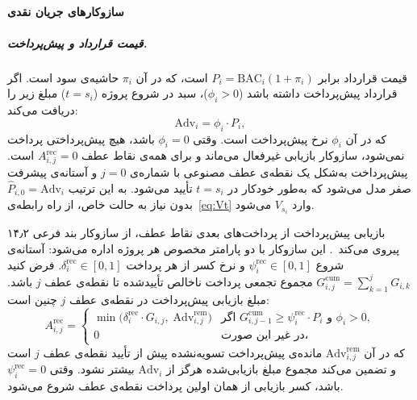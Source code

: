 \paragraph{سازوکارهای جریان نقدی }
\label{subsubsec:cashflow}

\subparagraph{قیمت قرارداد و پیش‌پرداخت.}
قیمت قرارداد برابر $P_i = \mathrm{BAC}_i (1 + \pi_i)$ است، که در آن
$\pi_i$ حاشیه‌ی سود است. اگر قرارداد پیش‌پرداخت داشته باشد
($\phi_i > 0$)، سبد در شروع پروژه ($t = s_i$) مبلغ زیر را دریافت
می‌کند:
\begin{equation}
  \mathrm{Adv}_i = \phi_i \cdot P_i,
  \label{eq:advance}
\end{equation}
که در آن $\phi_i$ نرخ پیش‌پرداخت است. وقتی $\phi_i = 0$ باشد، هیچ
پیش‌پرداختی پرداخت نمی‌شود، سازوکار بازیابی غیرفعال می‌ماند و برای همه‌ی
نقاط عطف $A^{\mathrm{rec}}_{i,j} = 0$ است. پیش‌پرداخت به‌شکل یک نقطه‌ی
عطف مصنوعی با شماره‌ی $j = 0$ و آستانه‌ی پیشرفت صفر مدل می‌شود که
به‌طور خودکار در $t = s_i$ تأیید می‌شود. به این ترتیب
$\hat{P}_{i,0} = \mathrm{Adv}_i$ بدون نیاز به حالت خاص، از راه
رابطه‌ی~\eqref{eq:Vt} وارد $V_{s_i}$ می‌شود.

بازیابی پیش‌پرداخت از پرداخت‌های بعدی نقاط عطف، از سازوکار بند فرعی
۱۴٫۲  پیروی می‌کند~\citep{FIDIC2017}. این سازوکار با دو
پارامتر مخصوص هر پروژه اداره می‌شود: آستانه‌ی شروع
$\psi^{\mathrm{rec}}_i \in [0,1]$ و نرخ کسر از هر پرداخت
$\delta^{\mathrm{rec}}_i \in [0,1]$. فرض کنید
$G^{\mathrm{cum}}_{i,j} = \sum_{k=1}^{j} G_{i,k}$ مجموع تجمعی پرداخت
ناخالص تأییدشده تا نقطه‌ی عطف $j$ باشد. مبلغ بازیابی پیش‌پرداخت در
نقطه‌ی عطف $j$ چنین است:
\begin{equation}
  A^{\mathrm{rec}}_{i,j}
    = \begin{cases}
        \min\!\bigl(\delta^{\mathrm{rec}}_i \cdot G_{i,j},\;
          \mathrm{Adv}^{\mathrm{rem}}_{i,j}\bigr)
          & \text{اگر } G^{\mathrm{cum}}_{i,j-1} \geq
            \psi^{\mathrm{rec}}_i \cdot P_i
            \text{ و } \phi_i > 0, \\
        0 & \text{در غیر این صورت،}
      \end{cases}
  \label{eq:advance_rec}
\end{equation}
که در آن $\mathrm{Adv}^{\mathrm{rem}}_{i,j}$ مانده‌ی پیش‌پرداخت
تسویه‌نشده پیش از تأیید نقطه‌ی عطف $j$ است و تضمین می‌کند مجموع مبلغ
بازیابی‌شده هرگز از $\mathrm{Adv}_i$ بیشتر نشود. وقتی
$\psi^{\mathrm{rec}}_i = 0$ باشد، کسر بازیابی از همان اولین پرداخت
نقطه‌ی عطف شروع می‌شود.

